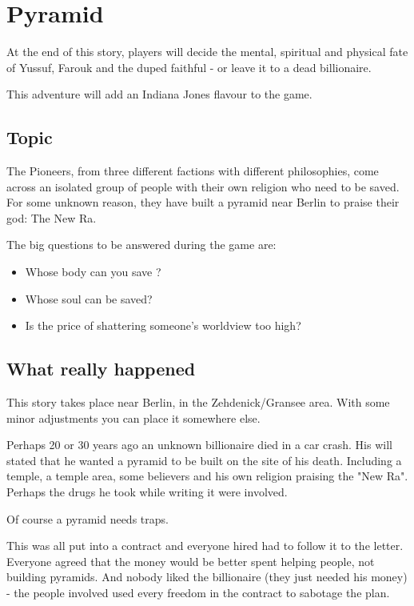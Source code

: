 
\chapter{Pyramid}
\label{ch:adventure pyramid}

At the end of this story, players will decide the mental, spiritual and physical fate of Yussuf, Farouk and the duped faithful - or leave it to a dead billionaire.

This adventure will add an Indiana Jones flavour to the game.

\section{Topic}

The Pioneers, from three different factions with different philosophies, come across an isolated group of people with their own religion who need to be saved. For some unknown reason, they have built a pyramid near Berlin to praise their god: The New Ra.

The big questions to be answered during the game are:

\begin{itemize}
    \item Whose body can you save ?
    \item Whose soul can be saved?
    \item Is the price of shattering someone's worldview too high?
\end{itemize}

\section{What really happened}

This story takes place near Berlin, in the Zehdenick/Gransee area. With some minor adjustments you can place it somewhere else.

Perhaps 20 or 30 years ago an unknown billionaire died in a car crash. His will stated that he wanted a pyramid to be built on the site of his death. Including a temple, a temple area, some believers and his own religion praising the "New Ra". Perhaps the drugs he took while writing it were involved.

Of course a pyramid needs traps.

This was all put into a contract and everyone hired had to follow it to the letter. Everyone agreed that the money would be better spent helping people, not building pyramids. And nobody liked the billionaire (they just needed his money) - the people involved used every freedom in the contract to sabotage the plan.

